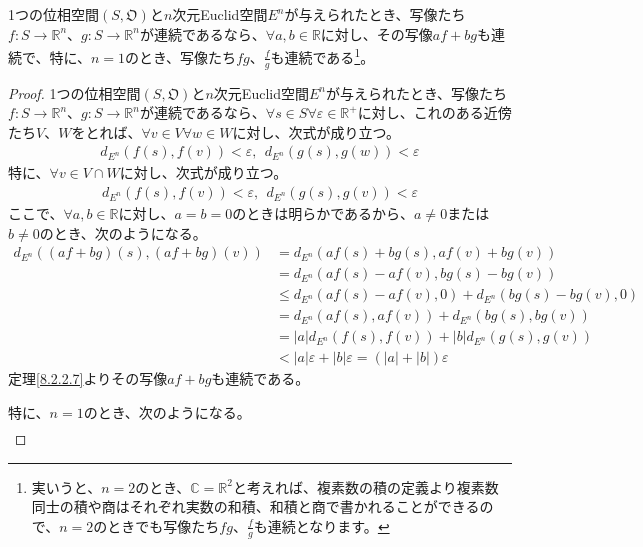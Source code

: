 \documentclass[dvipdfmx]{jsarticle}
\begin{document}
\begin{thm}\label{8.2.2.8}
1つの位相空間$\left( S,\mathfrak{O} \right)$と$n$次元Euclid空間$E^{n}$が与えられたとき、写像たち$f:S \rightarrow \mathbb{R}^{n}$、$g:S \rightarrow \mathbb{R}^{n}$が連続であるなら、$\forall a,b \in \mathbb{R}$に対し、その写像$af + bg$も連続で、特に、$n = 1$のとき、写像たち$fg$、$\frac{f}{g}$も連続である\footnote{実いうと、$n = 2$のとき、$\mathbb{C} =\mathbb{R}^2 $と考えれば、複素数の積の定義より複素数同士の積や商はそれぞれ実数の和積、和積と商で書かれることができるので、$n = 2$のときでも写像たち$fg$、$\frac{f}{g}$も連続となります。}。
\end{thm}
\begin{proof}
1つの位相空間$\left( S,\mathfrak{O} \right)$と$n$次元Euclid空間$E^{n}$が与えられたとき、写像たち$f:S \rightarrow \mathbb{R}^{n}$、$g:S \rightarrow \mathbb{R}^{n}$が連続であるなら、$\forall s \in S\forall\varepsilon \in \mathbb{R}^{+}$に対し、これのある近傍たち$V$、$W$をとれば、$\forall v \in V\forall w \in W$に対し、次式が成り立つ。
\begin{align*}
d_{E^{n}}\left( f(s),f(v) \right) < \varepsilon,\ \ d_{E^{n}}\left( g(s),g(w) \right) < \varepsilon
\end{align*}
特に、$\forall v \in V \cap W$に対し、次式が成り立つ。
\begin{align*}
d_{E^{n}}\left( f(s),f(v) \right) < \varepsilon,\ \ d_{E^{n}}\left( g(s),g(v) \right) < \varepsilon
\end{align*}
ここで、$\forall a,b \in \mathbb{R}$に対し、$a = b = 0$のときは明らかであるから、$a \neq 0$または$b \neq 0$のとき、次のようになる。
\begin{align*}
d_{E^{n}}\left( (af + bg)(s),(af + bg)(v) \right) &= d_{E^{n}}\left( af(s) + bg(s),af(v) + bg(v) \right)\\
&= d_{E^{n}}\left( af(s) - af(v),bg(s) - bg(v) \right)\\
&\leq d_{E^{n}}\left( af(s) - af(v),0 \right) + d_{E^{n}}\left( bg(s) - bg(v),0 \right)\\
&= d_{E^{n}}\left( af(s),af(v) \right) + d_{E^{n}}\left( bg(s),bg(v) \right)\\
&= |a|d_{E^{n}}\left( f(s),f(v) \right) + |b|d_{E^{n}}\left( g(s),g(v) \right)\\
&< |a|\varepsilon + |b|\varepsilon = \left( |a| + |b| \right)\varepsilon
\end{align*}
定理\ref{8.2.2.7}よりその写像$af + bg$も連続である。\par
特に、$n = 1$のとき、次のようになる。
\begin{align*}

\end{align*}
\end{proof}
\end{document}
